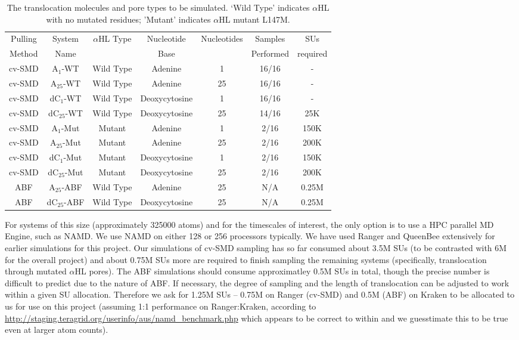 \documentclass[a4paper,10pt]{article}
\newcommand{\dctfnsp}{dC$_{25}$}
\newcommand{\atfnsp}{A$_{25}$}
\newcommand{\dconsp}{dC$_{1}$}
\newcommand{\aonsp}{A$_{1}$}
\newcommand{\ahl}{$\alpha$HL }
\begin{document}
\begin{table}[!h]
\begin{center}
  \caption{The translocation molecules and pore types
to be simulated. `Wild Type' indicates \ahl with no mutated residues;
'Mutant' indicates \ahl mutant L147M.\newline  
}
\label{table:systems}
\begin{tabular}{| c | c | c | c | c | c | c |}
\hline
Pulling & System & \ahl Type & Nucleotide & Nucleotides & Samples &
SUs \\
Method & Name &  & Base &  & Performed & required \\
\hline
cv-SMD & \aonsp-WT & Wild Type & Adenine & 1 & 16/16 & - \\
cv-SMD & \atfnsp-WT & Wild Type & Adenine & 25 & 16/16 & - \\
cv-SMD & \dconsp-WT & Wild Type & Deoxycytosine & 1 & 16/16 & - \\
cv-SMD & \dctfnsp-WT & Wild Type & Deoxycytosine & 25 & 14/16 & 25K\\
cv-SMD & \aonsp-Mut & Mutant & Adenine & 1 & 2/16 & 150K \\
cv-SMD & \atfnsp-Mut & Mutant & Adenine & 25 & 2/16 & 200K \\
cv-SMD & \dconsp-Mut & Mutant & Deoxycytosine & 1 & 2/16 & 150K \\
cv-SMD & \dctfnsp-Mut & Mutant & Deoxycytosine & 25 & 2/16 & 200K \\
ABF & \atfnsp-ABF & Wild Type & Adenine & 25 & N/A & 0.25M \\
ABF & \dctfnsp-ABF & Wild Type & Deoxycytosine & 25 & N/A & 0.25M \\
\hline
\end{tabular}
\end{center}
\end{table}

For systems of this size (approximately 325000 atoms) and for the timescales of interest, the only option is to use a HPC parallel MD Engine, such as NAMD.  We use NAMD on either 128 or 256 processors typically. We have used Ranger and QueenBee extensively for earlier simulations for this project. Our simulations of cv-SMD sampling has so far consumed about 3.5M SUs (to be contrasted with 6M for the overall project) and about 0.75M SUs more are required to finish sampling the remaining systems (specifically, translocation through mutated \ahl pores).  The ABF simulations should consume approximatley 0.5M SUs in total, though the precise number is difficult to predict due to the nature of ABF. If necessary, the degree of sampling and the length of translocation can be adjusted to work within a given SU allocation. Therefore we ask for 1.25M SUs -- 0.75M on Ranger (cv-SMD) and 0.5M (ABF) on Kraken to be allocated to us for use on this project (assuming 1:1 performance on Ranger:Kraken, according to {\url{http://staging.teragrid.org/userinfo/aus/namd_benchmark.php}} which appears to be correct to within and we guesstimate this to be true even at larger atom counts).
\end{document}
